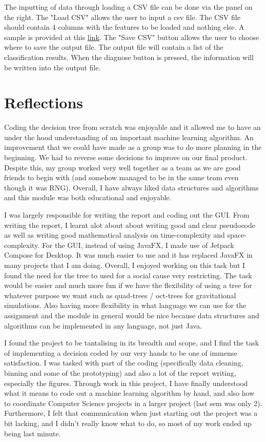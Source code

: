 The inputting of data through loading a CSV file can be done via the panel on the right. The "Load CSV" allows the user to input a csv file. The CSV file should contain 4 columns with the features to be loaded and nothing else. A sample is provided at this \href{https://nushighedu-my.sharepoint.com/:x:/g/personal/h1810084_nushigh_edu_sg/ERyyrju9vEJJoOo8wW9L8mYB2RaX_GNevY3PBxZBZaeQCw?e=eewdHe}{link}. The "Save CSV" button allows the user to choose where to save the output file. The output file will contain a list of the classification results. When the diagnose button is pressed, the information will be written into the output file.

\section{Reflections}
 Coding the decision tree from scratch was enjoyable and it allowed me to have an under the hood understanding of an important machine learning algorithm. An improvement that we could have made as a group was to do more planning in the beginning. We had to reverse some decisions to improve on our final product. Despite this, my group worked very well together as a team as we are good friends to begin with (and somehow managed to be in the same team even though it was RNG). Overall, I have always liked data structures and algorithms and this module was both educational and enjoyable.

 I was largely responsible for writing the report and coding out the GUI. From writing the report, I learnt alot about about writing good and clear pseudocode as well as writing good mathematical analysis on time-complexity and space-complexity. For the GUI, instead of using JavaFX, I made use of Jetpack Compose for Desktop. It was much easier to use and it has replaced JavaFX in many projects that I am doing. Overall, I enjoyed working on this task but I found the need for the tree to used for a social cause very restricting. The task would be easier and much more fun if we have the flexibility of using a tree for whatever purpose we want such as quad-trees / oct-trees for gravitational simulations. Also having more flexibility in what language we can use for the assignment and the module in general would be nice because data structures and algorithms can be implemented in any language, not just Java.

I found the project to be tantalising in its breadth and scope, and I find the task of implementing a decision coded by our very hands to be one of immense satisfaction. 
I was tasked with part of the coding (specifically data cleaning, binning and some of the prototyping) and also a lot of the report writing, especially the figures.
Through work in this project, I have finally understood what it means to code out a machine learning algorithm by hand, and also how to coordinate Computer Science projects in a larger project (last sem was only 2).
Furthermore, I felt that communication when just starting out the project was a bit lacking, and I didn't really know what to do, so most of my work ended up being last minute. 

